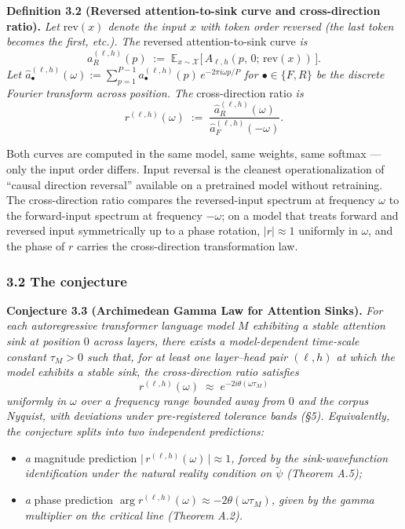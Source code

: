 \documentclass[
  letterpaper,
  11pt]{article}
\providecommand{\tightlist}{%
  \setlength{\itemsep}{0pt}\setlength{\parskip}{0pt}}
\theoremstyle{plain}
\theoremstyle{definition}
\theoremstyle{remark}
\begin{document}
\textbf{Definition 3.2 (Reversed attention-to-sink curve and cross-direction ratio).} \emph{Let \(\mathrm{rev}(x)\) denote the input \(x\) with token order reversed (the last token becomes the first, etc.). The} reversed attention-to-sink curve \emph{is}
\[a_R^{(\ell, h)}(p) \;:=\; \mathbb{E}_{x \sim \mathcal{X}}\bigl[\, A_{\ell, h}(p,\, 0;\, \mathrm{rev}(x))\, \bigr].\]
\emph{Let \(\hat a_\bullet^{(\ell, h)}(\omega) := \sum_{p=1}^{P-1} a_\bullet^{(\ell, h)}(p)\, e^{-2\pi i \omega p / P}\) for \(\bullet \in \{F, R\}\) be the discrete Fourier transform across position. The} cross-direction ratio \emph{is}
\[r^{(\ell, h)}(\omega) \;:=\; \frac{\hat a_R^{(\ell, h)}(\omega)}{\hat a_F^{(\ell, h)}(-\omega)}.\]

Both curves are computed in the same model, same weights, same softmax --- only the input order differs. Input reversal is the cleanest operationalization of ``causal direction reversal'' available on a pretrained model without retraining. The cross-direction ratio compares the reversed-input spectrum at frequency \(\omega\) to the forward-input spectrum at frequency \(-\omega\); on a model that treats forward and reversed input symmetrically up to a phase rotation, \(|r| \approx 1\) uniformly in \(\omega\), and the phase of \(r\) carries the cross-direction transformation law.

\subsubsection{3.2 The conjecture}\label{the-conjecture}

\textbf{Conjecture 3.3 (Archimedean Gamma Law for Attention Sinks).} \emph{For each autoregressive transformer language model \(M\) exhibiting a stable attention sink at position \(0\) across layers, there exists a model-dependent time-scale constant \(\tau_M > 0\) such that, for at least one layer--head pair \((\ell, h)\) at which the model exhibits a stable sink, the cross-direction ratio satisfies}
\[r^{(\ell, h)}(\omega) \;\approx\; e^{-2i\theta(\omega \tau_M)}\]
\emph{uniformly in \(\omega\) over a frequency range bounded away from \(0\) and the corpus Nyquist, with deviations under pre-registered tolerance bands (§5). Equivalently, the conjecture splits into two independent predictions:}

\begin{itemize}
\tightlist
\item
  \emph{a} magnitude prediction \emph{\(\bigl|\,r^{(\ell, h)}(\omega)\,\bigr| \approx 1\), forced by the sink-wavefunction identification under the natural reality condition on \(\tilde\psi\) (Theorem A.5);}
\item
  \emph{a} phase prediction \emph{\(\arg r^{(\ell, h)}(\omega) \approx -2\theta(\omega\tau_M)\), given by the gamma multiplier on the critical line (Theorem A.2).}
\end{itemize}
\end{document}
